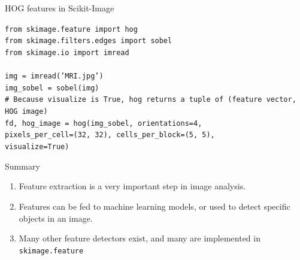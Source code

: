 \documentclass[9pt, aspectratio=169]{beamer}
\begin{document}
\begin{frame}
    {HOG features in Scikit-Image}
    \begin{codebox}
        \texttt{from skimage.feature import hog\\
            from skimage.filters.edges import sobel\\
            from skimage.io import imread\\
            \\
            img = imread('MRI.jpg')\\
            img\_sobel = sobel(img)\\
            \# Because visualize is True, hog returns a tuple of  (feature vector, HOG image)\\
            fd, hog\_image = hog(img\_sobel, orientations=4,\\
            pixels\_per\_cell=(32, 32), cells\_per\_block=(5, 5),\\
            visualize=True)}
    \end{codebox}
\end{frame}

\begin{frame}
    {Summary}

    \begin{enumerate}
        \item Feature extraction is a very important step in image analysis.
        \item Features can be fed to machine learning models, or used to detect specific objects in an image.
        \item Many other feature detectors exist, and many are implemented in \texttt{skimage.feature}
    \end{enumerate}

\end{frame}
\end{document}
